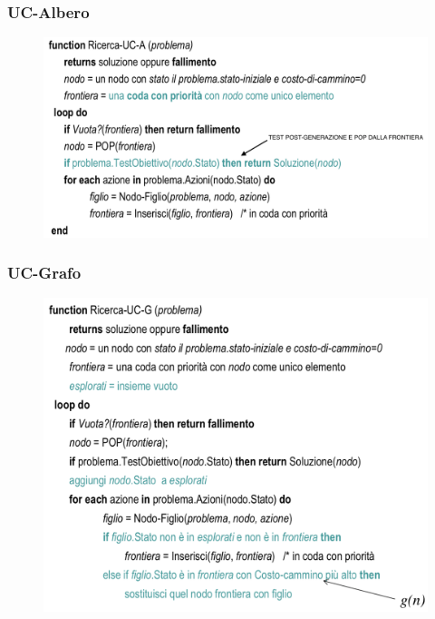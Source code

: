 \documentclass{article}
\begin{document}
\subsubsection{UC-Albero}
\begin{figure}[H]
    \centering
    \includegraphics[scale=0.45]{Images/UC-A.png}
\end{figure}

\subsubsection{UC-Grafo}
\begin{figure}[H]
    \centering
    \includegraphics[scale=0.5]{Images/UC-G.png}
\end{figure}
\end{document}
